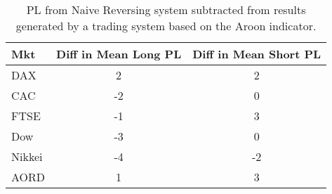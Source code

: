 \begin{table}[ht]
\centering
\caption[Aroon system results minus Naive Reversing results]{PL from Naive Reversing system subtracted from results generated by a trading system based on the Aroon indicator.} 
\label{tab:aroon_results_diff}
\begin{tabular}{lcc}
  \toprule Mkt & Diff in Mean Long PL & Diff in Mean Short PL \\ 
  \midrule DAX & 2 & 2 \\ 
  CAC & -2 & 0 \\ 
  FTSE & -1 & 3 \\ 
  Dow & -3 & 0 \\ 
  Nikkei & -4 & -2 \\ 
  AORD & 1 & 3 \\ 
   \bottomrule \end{tabular}
\end{table}
